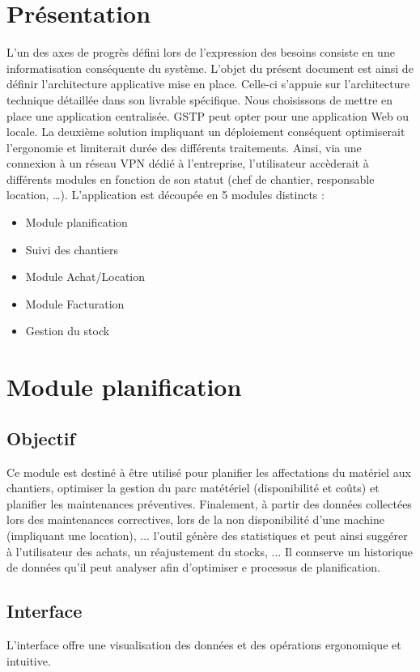 \section{Présentation}
L’un des axes de progrès défini lors de l’expression des besoins consiste en une informatisation conséquente du système. L’objet du présent document est ainsi de définir l’architecture applicative mise en place. Celle-ci s’appuie sur l’architecture technique détaillée dans son livrable spécifique.
Nous choisissons de mettre en place une application centralisée. GSTP peut opter pour une application Web ou locale. La deuxième solution impliquant un déploiement conséquent optimiserait l’ergonomie et limiterait durée des différents traitements. Ainsi, via une connexion à un réseau VPN dédié à l’entreprise, l’utilisateur accèderait à différents modules en fonction de son statut (chef de chantier, responsable location, …).
L’application est découpée en 5 modules distincts :
\begin{itemize}
	\item Module planification
	\item Suivi des chantiers
	\item Module Achat/Location
	\item Module Facturation
	\item Gestion du stock
\end{itemize}

\section{Module planification}
	\subsection{Objectif}
	Ce module est destiné à être utilisé pour planifier les affectations du matériel aux chantiers, optimiser la gestion du parc matétériel (disponibilité et coûts) 
	et planifier les maintenances préventives.
	Finalement, à partir des données collectées lors des maintenances correctives, lors de la non disponibilité d'une machine (impliquant une location), ... l'outil génère des 
	statistiques et peut ainsi suggérer à l'utilisateur des achats, un réajustement du stocks, ...
	Il connserve un historique de données qu'il peut analyser afin d'optimiser e processus de planification.\\ 

	\subsection{Interface}
	L'interface offre une visualisation des données et des opérations ergonomique et intuitive.\\ 

